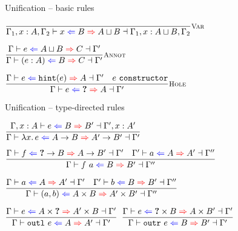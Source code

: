 \documentclass{beamer}
\begin{document}
\begin{frame}{Unification -- basic rules}

\begin{center}
  $\infrule[Var]{}{\fulluniftyping{\Gamma_1, x : A, \Gamma_2}{x}{B}{\hintlub{A}{B}}{\Gamma_1, x : \hintlub{A}{B}, \Gamma_2}}$

  \vspace{2em}

  $\infrule[Annot]{\uniftyping{e}{\hintlub{A}{B}}{C}}{\uniftyping{\annot{e}{A}}{B}{C}}$

  \vspace{2em}

  $\infrule[Hole]{\uniftyping{e}{\hintfor{e}}{A} \quad \sidecond{e\ \texttt{constructor}}}{\uniftyping{e}{\Hole}{A}}$
\end{center}

\end{frame}

\begin{frame}{Unification -- type-directed rules}

\begin{center}
  $\infrule{\fulluniftyping{\extend{\Gamma}{x}{A}}{e}{B}{B'}{\extend{\Gamma'}{x}{A'}}}{\uniftyping{\fun{x}{e}}{\Fun{A}{B}}{\Fun{A'}{B'}}}$

  \vspace{1em}

  $\infrule{\fulluniftyping{\Gamma}{f}{\Fun{\Hole}{B}}{\Fun{A}{B'}}{\Gamma'} \quad \fulluniftyping{\Gamma'}{a}{A}{A'}{\Gamma''}}{\fulluniftyping{\Gamma}{\app{f}{a}}{B}{B'}{\Gamma''}}$

  \vspace{1em}

  $\infrule{\fulluniftyping{\Gamma}{a}{A}{A'}{\Gamma'} \quad \fulluniftyping{\Gamma'}{b}{B}{B'}{\Gamma''}}{\fulluniftyping{\Gamma}{\pair{a}{b}}{\Prod{A}{B}}{\Prod{A'}{B'}}{\Gamma''}}$

  \vspace{1em}

  $\infrule{\uniftyping{e}{\Prod{A}{\Hole}}{\Prod{A'}{B}}}{\uniftyping{\outl{e}}{A}{A'}}$
  \quad
  $\infrule{\uniftyping{e}{\Prod{\Hole}{B}}{\Prod{A}{B'}}}{\uniftyping{\outr{e}}{B}{B'}}$
\end{center}

\end{frame}
\end{document}
